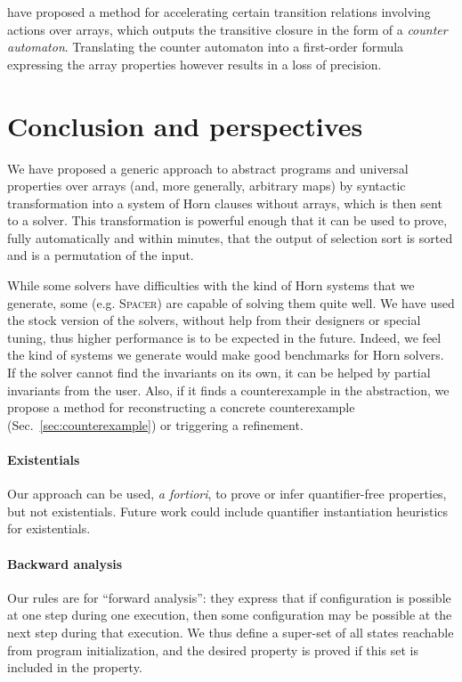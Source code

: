 \documentclass[a4paper]{article}
\newcommand{\soft}[1]{\textsc{#1}}
\theoremstyle{definition}
\theoremstyle{plain}
\begin{document}
\citet{BozgaHIKV09} have proposed a method for accelerating certain transition relations involving actions over arrays, which outputs the transitive closure in the form of a \emph{counter automaton}.
Translating the counter automaton into a first-order formula expressing the array properties however results in a loss of precision.



\section{Conclusion and perspectives}
\label{sec:conclusion}
We have proposed a generic approach to abstract programs and universal properties over arrays (and, more generally, arbitrary maps) by syntactic transformation into a system of Horn clauses without arrays, which is then sent to a solver.
This transformation is powerful enough that it can be used to prove, fully automatically and within minutes, that the output of selection sort is sorted and is a permutation of the input.

While some solvers have difficulties with the kind of Horn systems that we generate, some (e.g. \soft{Spacer}) are capable of solving them quite well.
We have used the stock version of the solvers, without help from their designers or special tuning, thus higher performance is to be expected in the future.
Indeed, we feel the kind of systems we generate would make good benchmarks for Horn solvers.
If the solver cannot find the invariants on its own, it can be helped by partial invariants from the user.
Also, if it finds a counterexample in the abstraction, we propose a method for reconstructing a concrete counterexample (Sec.~\ref{sec:counterexample}) or triggering a refinement.

\paragraph{Existentials}
Our approach can be used, \emph{a fortiori}, to prove or infer quantifier-free properties, but not existentials. Future work could include quantifier instantiation heuristics for existentials.

\paragraph{Backward analysis}
Our rules are for ``forward analysis'': they express that if configuration is possible at one step during one execution, then some configuration may be possible at the next step during that execution.
We thus define a super-set of all states reachable from program initialization, and the desired property is proved if this set is included in the property.
\end{document}
